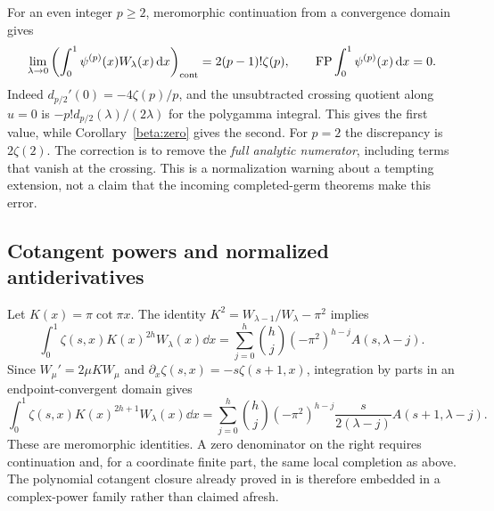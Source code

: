 \begin{remark}
\label{beta:anomaly}
For an even integer $p\geq2$, meromorphic continuation from a
convergence domain gives
\begin{equation}\label{beta:anomalyformula}
 \lim_{\lambda\to0}
 \left(\int_0^1\psi^{(p)}(x)W_\lambda(x)\,\mathrm d x\right)_{\mathrm{cont}}
 =2(p-1)!\zeta(p),
 \qquad
 \operatorname{FP}\int_0^1\psi^{(p)}(x)\,\mathrm d x=0.
\end{equation}
Indeed $d_{p/2}'(0)=-4\zeta(p)/p$, and the unsubtracted crossing
quotient along $u=0$ is
$-p!d_{p/2}(\lambda)/(2\lambda)$ for the polygamma integral.
This gives the first value, while Corollary~\ref{beta:zero} gives the
second. For $p=2$ the discrepancy is $2\zeta(2)$. The correction is
to remove the \emph{full analytic numerator}, including terms that
vanish at the crossing. This is a normalization warning about a
tempting extension, not a claim that the incoming completed-germ
theorems make this error.
\end{remark}

\subsection{Cotangent powers and normalized antiderivatives}

Let $K(x)=\pi\cot\pi x$. The identity
$K^2=W_{\lambda-1}/W_\lambda-\pi^2$ implies
\begin{equation}\label{beta:evencot}
 \int_0^1\zeta(s,x)K(x)^{2h}W_\lambda(x)\dd x
 =\sum_{j=0}^h\binom hj(-\pi^2)^{h-j}A(s,\lambda-j).
\end{equation}
Since $W_\mu'=2\mu K W_\mu$ and
$\partial_x\zeta(s,x)=-s\zeta(s+1,x)$, integration by parts in
an endpoint-convergent domain gives
\begin{equation}\label{beta:oddcot}
 \int_0^1\zeta(s,x)K(x)^{2h+1}W_\lambda(x)\dd x
 =\sum_{j=0}^h\binom hj(-\pi^2)^{h-j}
   \frac{s}{2(\lambda-j)}A(s+1,\lambda-j).
\end{equation}
These are meromorphic identities. A zero denominator on the right
requires continuation and, for a coordinate finite part, the same
local completion as above. The polynomial cotangent closure already
proved in \cite{RepoExact} is therefore embedded in a complex-power
family rather than claimed afresh.

